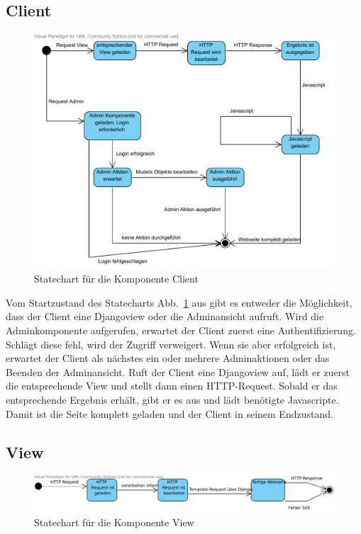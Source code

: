 \subsection{Client}
\begin{figure}[H]
\includegraphics[width=0.8\linewidth]{bilder/KompClient.pdf}
\caption{Statechart für die Komponente Client}
\label{StClient}
\end{figure}

Vom Startzustand des Statecharts Abb.\ \ref{StClient} aus gibt es entweder die 
Möglichkeit, dass der Client eine Djangoview oder die Adminansicht aufruft. Wird 
die Adminkomponente aufgerufen, erwartet der Client zuerst eine 
Authentifizierung. Schlägt diese fehl, wird der Zugriff verweigert. Wenn sie 
aber erfolgreich ist, erwartet der Client als nächstes ein oder mehrere 
Adminaktionen oder das Beenden der Adminansicht. Ruft der Client eine Djangoview 
auf, lädt er zuerst die entsprechende View und stellt dann einen HTTP-Request. 
Sobald er das entsprechende Ergebnis erhält, gibt er es aus und lädt benötigte 
Javascripte. Damit ist die Seite komplett geladen und der Client in seinem 
Endzustand.

\subsection{View}
\begin{figure}[H]
\includegraphics[width=0.8\linewidth]{bilder/KompView.pdf}
\caption{Statechart für die Komponente View}
\label{StView}
\end{figure}

